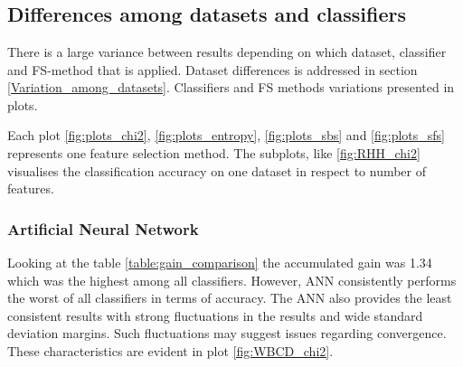 \begin{table}[h]
   \\
  \caption[]%
  {{\small All datasets except MIAS benefited from feature selection using CART Decision Tree classifier.}}
  \label{table:CART}
\end{table}

\begin{table}[h]
   \\
  \caption[]%
  {{\small Naive Bayes sees improvement or equivalent accuracy by feature selection on every dataset.}}
  \label{table:NB}
\end{table}

\begin{table}[h]
   \\
  \caption[]%
  {{\small Classification accuracy achieved by SVM was improved or equivalent on every dataset with use of feature selection.}}
  \label{table:SVM}
\end{table}


\subsection{Differences among datasets and classifiers}

There is a large variance between results depending on which dataset, classifier and FS-method that is applied. Dataset differences is addressed in section \ref{Variation_among_datasets}. Classifiers and FS methods variations presented in plots.

Each plot \ref{fig:plots_chi2}, \ref{fig:plots_entropy}, \ref{fig:plots_sbs} and \ref{fig:plots_sfs} represents one feature selection method. The subplots, like \ref{fig:RHH_chi2} visualises the classification accuracy on one dataset in respect to number of features.

\begin{table}[hp]
  
  \caption[]%
  {{\small Ranking of which classifiers gained most accuracy when comparing feature selection to full dataset.}}
  \label{table:gain_comparison}
\end{table}

\subsubsection{Artificial Neural Network}

Looking at the table \ref{table:gain_comparison} the accumulated gain was 1.34 which was the highest among all classifiers. However, ANN consistently performs the worst of all classifiers in terms of accuracy. The ANN also provides the least consistent results with strong fluctuations in the results and wide standard deviation margins. Such fluctuations may suggest issues regarding convergence. These characteristics are evident in plot \ref{fig:WBCD_chi2}.

